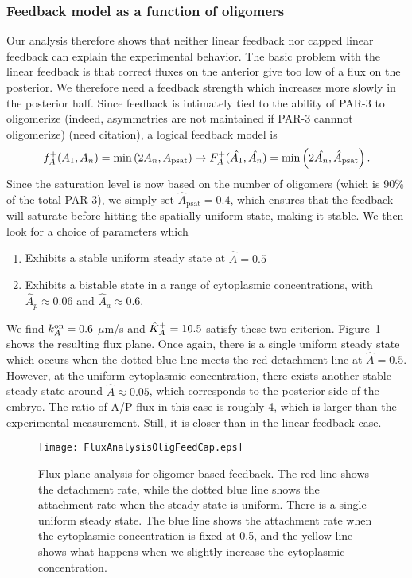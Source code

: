 \documentclass[11pt]{article}
\newcommand{\red}[1]{\color{red}#1\normalcolor}
\newcommand{\6}[1]{#1_{\text{6}}}
\newcommand{\3}[1]{#1_{\text{3}}}
\begin{document}
\subsubsection{Feedback model as a function of oligomers}
Our analysis therefore shows that neither linear feedback nor capped linear feedback can explain the experimental behavior. The basic problem with the linear feedback is that correct fluxes on the anterior give too low of a flux on the posterior. We therefore need a feedback strength which increases more slowly in the posterior half. Since feedback is intimately tied to the ability of PAR-3 to oligomerize (indeed, asymmetries are not maintained if PAR-3 cannnot oligomerize) \red{(need citation)}, a logical feedback model is 
\begin{equation}
f_A^+(A_1,A_n) =\min\left(2A_n,A_\text{psat}\right) \rightarrow F_A^+(\hat {A_1}, \hat {A_n}) = \min\left(2\hat {A_n}, \hat A_\text{psat}\right).
\end{equation}
Since the saturation level is now based on the number of oligomers (which is 90\% of the total PAR-3), we simply set $\hat A_\text{psat}=0.4$, which ensures that the feedback will saturate before hitting the spatially uniform state, making it stable. We then look for a choice of parameters which
\begin{enumerate}
\item Exhibits a stable uniform steady state at $\hat A = 0.5$
\item Exhibits a bistable state in a range of cytoplasmic concentrations, with $\hat A_p \approx 0.06$ and $\hat A_a \approx 0.6$. 
\end{enumerate}
We find $k^\text{on}_A = 0.6$ $\mu$m/s and $\hat{K}^\text{+}_A=10.5$ satisfy these two criterion. Figure\ \ref{fig:P3OCap} shows the resulting flux plane. Once again, there is a single uniform steady state which occurs when the dotted blue line meets the red detachment line at $\hat A=0.5$. However, at the uniform cytoplasmic concentration, there exists another stable steady state around $\hat A \approx 0.05$, which corresponds to the posterior side of the embryo. The ratio of A/P flux in this case is roughly 4, which is larger than the experimental measurement. Still, it is closer than in the linear feedback case.

\begin{figure}
\centering
\texttt{[image: FluxAnalysisOligFeedCap.eps]}
\caption{\label{fig:P3OCap}Flux plane analysis for oligomer-based feedback. The red line shows the detachment rate, while the dotted blue line shows the attachment rate when the steady state is uniform. There is a single uniform steady state. The blue line shows the attachment rate when the cytoplasmic concentration is fixed at 0.5, and the yellow line shows what happens when we slightly increase the cytoplasmic concentration.}
\end{figure}
\end{document}
